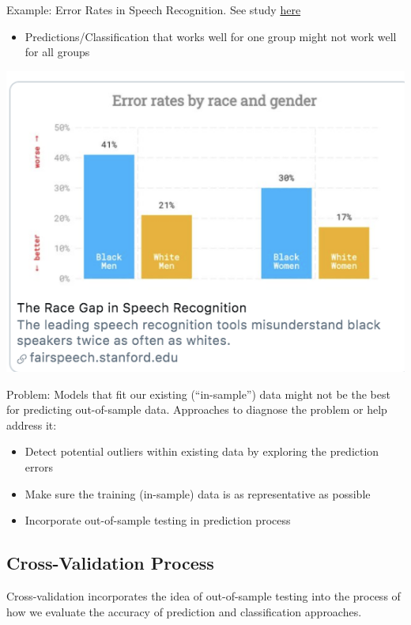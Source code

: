 \documentclass[
  letterpaper,
  DIV=11,
  numbers=noendperiod]{scrreprt}
\providecommand{\tightlist}{%
  \setlength{\itemsep}{0pt}\setlength{\parskip}{0pt}}\usepackage{longtable,booktabs,array}
\begin{document}
Example: Error Rates in Speech Recognition. See study
\href{https://news.stanford.edu/2020/03/23/automated-speech-recognition-less-accurate-blacks/}{here}

\begin{itemize}
\tightlist
\item
  Predictions/Classification that works well for one group might not
  work well for all groups
\end{itemize}

\includegraphics{images/speecherrors.png}

Problem: Models that fit our existing (``in-sample'') data might not be
the best for predicting out-of-sample data. Approaches to diagnose the
problem or help address it:

\begin{itemize}
\tightlist
\item
  Detect potential outliers within existing data by exploring the
  prediction errors
\item
  Make sure the training (in-sample) data is as representative as
  possible
\item
  Incorporate out-of-sample testing in prediction process
\end{itemize}

\hypertarget{cross-validation-process}{%
\subsection{Cross-Validation Process}\label{cross-validation-process}}

Cross-validation incorporates the idea of out-of-sample testing into the
process of how we evaluate the accuracy of prediction and classification
approaches.
\end{document}
